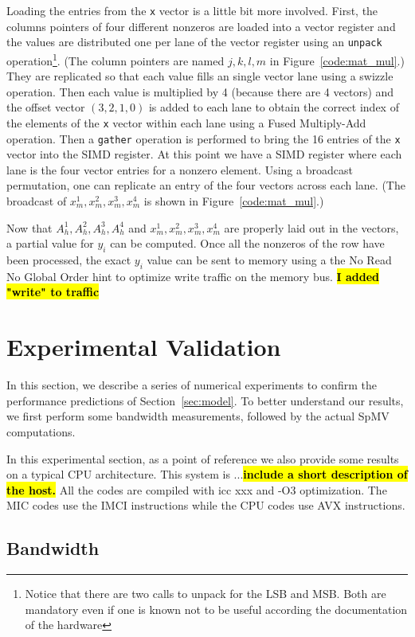 \documentclass[10pt,conference,compsocconf]{IEEEtran}
\newcommand{\todo}[1]{{\color{red}\textbf{\hl{#1}}\xspace}}
\begin{document}
Loading the entries from the {\tt x} vector is a little bit more
involved. First, the columns pointers of four different nonzeros are
loaded into a vector register and the values are distributed one per
lane of the vector register using an {\tt unpack}
operation\footnote{Notice that there are two calls to unpack for the
  LSB and MSB. Both are mandatory even if one is known not to be
  useful according the documentation of the hardware}. (The column
pointers are named $j,k,l,m$ in Figure~\ref{code:mat_mul}.) They
are replicated so that each value fills an single vector lane 
using a swizzle operation. Then each value is multiplied by 4 
(because there are 4 vectors) 
and the offset vector $(3,2,1,0)$ is added to each lane to obtain the
correct index of the elements of the {\tt x} vector within each lane
using a Fused Multiply-Add operation. Then a {\tt gather} operation is
performed to bring the 16 entries of the {\tt x} vector into the SIMD
register. At this point we have a SIMD register where each lane is the
four vector entries for a nonzero element. Using a broadcast
permutation, one can replicate an entry of the four vectors across
each lane. (The broadcast of $x_m^1,x_m^2,x_m^3,x_m^4$ is shown in
Figure~\ref{code:mat_mul}.)

Now that $A_h^1,A_h^2,A_h^3,A_h^4$ and $x_m^1,x_m^2,x_m^3,x_m^4$ are
properly laid out in the vectors, a partial value for $y_i$ can be
computed. Once all the nonzeros of the row have been processed, the
exact $y_i$ value can be sent to memory using a the No Read No Global
Order hint to optimize write traffic on the memory bus.
\todo{I added "write" to traffic }


\section{Experimental Validation}
\label{sec:expe}
In this section, we describe a series of numerical experiments to
confirm the performance predictions of Section~\ref{sec:model}. To
better understand our results, we first perform some bandwidth
measurements, followed by the actual SpMV computations.

In this experimental section, as a point of reference we also provide
some results on a typical CPU architecture. This system is
...\todo{include a short description of the host.}  All the codes are
compiled with icc xxx and -O3 optimization. The MIC codes use the IMCI
instructions while the CPU codes use AVX instructions.

\subsection{Bandwidth}
\end{document}
